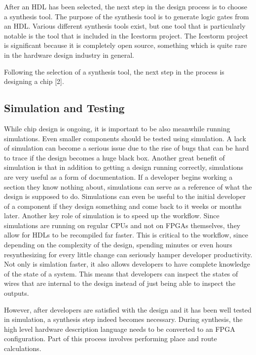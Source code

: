\documentclass{article}
\begin{document}
    After an HDL has been selected, the next step in the design process is to choose a
    synthesis tool. The purpose of the synthesis tool is to generate logic gates
    from an HDL. Various different synthesis tools exist, but one tool that
    is particularly notable is the tool that is included in the Icestorm project.
    The Icestorm project is significant because it is completely open source, something
    which is quite rare in the hardware design industry in general.

    Following the selection of a synthesis tool, the next step in the process
    is designing a chip [2].

    \subsection{Simulation and Testing}

    While chip design is ongoing, it is important to be also meanwhile running simulations.
    Even smaller components should be tested using simulation. A lack of simulation
    can become a serious issue due to the rise of bugs that can be hard to trace if
    the design becomes a huge black box. Another great benefit of simulation is that
    in addition to getting a design running correctly, simulations are very useful
    as a form of documentation. If a developer begins working a section they know nothing
    about, simulations can serve as a reference of what the design is supposed to do.
    Simulations can even be useful to the initial developer of a component if they design
    something and come back to it weeks or months later.
    Another key role of simulation is to speed up the workflow. Since simulations
    are running on regular CPUs and not on FPGAs themselves, they allow for HDLs to
    be recompiled far faster. This is critical to the workflow, since depending on
    the complexity of the design, spending minutes or even hours resynthesizing for
    every little change can seriously hamper developer productivity.
    Not only is simlation faster, it also allows developers to have complete knowledge
    of the state of a system. This means that developers can inspect the states
    of wires that are internal to the design instead of just being able to inspect the
    outputs.

    However, after developers are satisfied with the design and it has been well tested
    in simulation, a synthesis step indeed becomes necessary.
    During synthesis, the high level hardware description language needs to be converted
    to an FPGA configuration. Part of this process involves performing place and route
    calculations.
\end{document}

